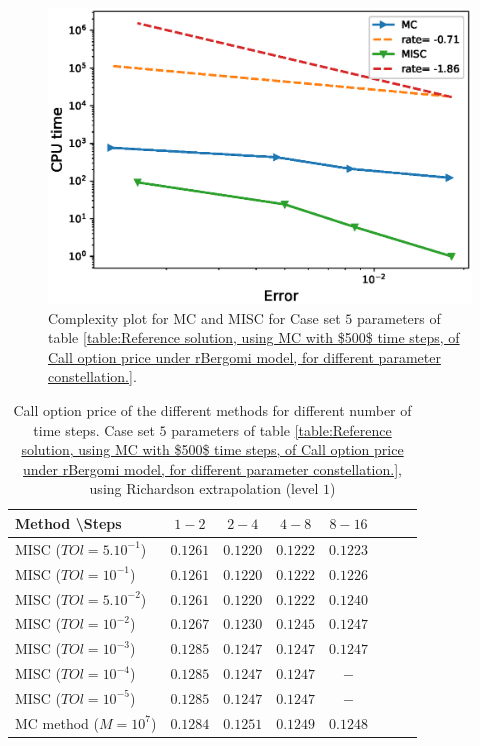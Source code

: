 \documentclass[11pt]{article}
\begin{document}
	\begin{figure}[h!]
	\centering
	\includegraphics[width=0.7\linewidth]{./figures/rBergomi_Complexity_rates/set5/error_vs_time_set5}

	\caption{Complexity plot for   MC and MISC for Case set $5$ parameters of table \ref{table:Reference solution, using MC with $500$ time steps, of Call option price under rBergomi model, for different parameter constellation.}.}
	\label{fig:Complexity plot for MC and MISC for Case set $5$ parameters}
\end{figure}
\FloatBarrier




\begin{table}[h!]
	\centering
	\begin{tabular}{l*{6}{c}r}
		Method \textbackslash  Steps    &$1-2$         & $2-4$ & $4-8$ & $8-16$\\
		\hline
		MISC ($TOl=5.10^{-1}$)   &$ 0.1261$ & $0.1220$ & $0.1222$ & $0.1223$\\
		MISC ($TOl=10^{-1}$)   &$ 0.1261$ & $0.1220$  &$0.1222$ & $0.1226$\\
		MISC ($TOl=5.10^{-2}$)   &$ 0.1261$ & $0.1220$  & $0.1222$ & $0.1240$ \\
		MISC ($TOl=10^{-2}$)   &$ 0.1267$ & $0.1230$ & $0.1245$ & $0.1247$  \\	
		MISC ($TOl=10^{-3}$)   &$0.1285$ & $0.1247$ & $0.1247$ &  $0.1247$ \\
		MISC ($TOl=10^{-4}$)  &$0.1285$ & $0.1247$ & $0.1247$ & $-$ \\
			MISC ($TOl=10^{-5}$)  &$0.1285$ & $0.1247$ &  $0.1247$ & $-$ \\
	
		\hline
		MC method ($M=10^{7}$)   & $     0.1284$  & $ 
		0.1251$  & $0.1249$ & $  0.1248$ \\		
		\hline
	\end{tabular}
	\caption{Call option price of the different methods for different number of time steps. Case set $5$ parameters of table \ref{table:Reference solution, using MC with $500$ time steps, of Call option price under rBergomi model, for different parameter constellation.}, using Richardson extrapolation (level $1$)}
	\label{table:  Call option price of the different methods for different number of time steps. Case set $5$ parameter, using Richardson extrapolation (level $1$)}
\end{table}
\end{document}
